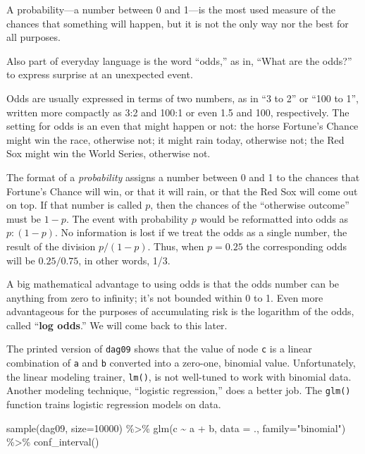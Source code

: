 \documentclass[
  letterpaper,
  DIV=11,
  numbers=noendperiod,
  oneside]{scrreprt}
\newenvironment{Shaded}{\begin{snugshade}}{\end{snugshade}}
\newcommand{\AttributeTok}[1]{\textcolor[rgb]{0.40,0.45,0.13}{#1}}
\newcommand{\DecValTok}[1]{\textcolor[rgb]{0.68,0.00,0.00}{#1}}
\newcommand{\FunctionTok}[1]{\textcolor[rgb]{0.28,0.35,0.67}{#1}}
\newcommand{\NormalTok}[1]{\textcolor[rgb]{0.00,0.23,0.31}{#1}}
\newcommand{\SpecialCharTok}[1]{\textcolor[rgb]{0.37,0.37,0.37}{#1}}
\newcommand{\StringTok}[1]{\textcolor[rgb]{0.13,0.47,0.30}{#1}}
\begin{document}
{\begin{footnotesize}
A probability---a number between 0 and 1---is the most used measure of
the chances that something will happen, but it is not the only way nor
the best for all purposes.

Also part of everyday language is the word ``odds,'' as in, ``What are
the odds?'' to express surprise at an unexpected event.

Odds are usually expressed in terms of two numbers, as in ``3 to 2'' or
``100 to 1'', written more compactly as 3:2 and 100:1 or even 1.5 and
100, respectively. The setting for odds is an even that might happen or
not: the horse Fortune's Chance might win the race, otherwise not; it
might rain today, otherwise not; the Red Sox might win the World Series,
otherwise not.

The format of a \emph{probability} assigns a number between 0 and 1 to
the chances that Fortune's Chance will win, or that it will rain, or
that the Red Sox will come out on top. If that number is called \(p\),
then the chances of the ``otherwise outcome'' must be \(1-p\). The event
with probability \(p\) would be reformatted into odds as \(p:(1-p)\). No
information is lost if we treat the odds as a single number, the result
of the division \(p/(1-p)\). Thus, when \(p=0.25\) the corresponding
odds will be \(0.25/0.75\), in other words, 1/3.

A big mathematical advantage to using odds is that the odds number can
be anything from zero to infinity; it's not bounded within 0 to 1. Even
more advantageous for the purposes of accumulating risk is the logarithm
of the odds, called ``\textbf{log odds}.'' We will come back to this
later.

The printed version of \texttt{dag09} shows that the value of node
\texttt{c} is a linear combination of \texttt{a} and \texttt{b}
converted into a zero-one, binomial value. Unfortunately, the linear
modeling trainer, \texttt{lm()}, is not well-tuned to work with binomial
data. Another modeling technique, ``logistic regression,'' does a better
job. The \texttt{glm()} function trains logistic regression models on
data.

\begin{Shaded}
\begin{Highlighting}[]
\FunctionTok{sample}\NormalTok{(dag09, }\AttributeTok{size=}\DecValTok{10000}\NormalTok{) }\SpecialCharTok{\%\textgreater{}\%} 
  \FunctionTok{glm}\NormalTok{(c }\SpecialCharTok{\textasciitilde{}}\NormalTok{ a }\SpecialCharTok{+}\NormalTok{ b, }\AttributeTok{data =}\NormalTok{ ., }\AttributeTok{family=}\StringTok{"binomial"}\NormalTok{) }\SpecialCharTok{\%\textgreater{}\%}
  \FunctionTok{conf\_interval}\NormalTok{()}
\end{Highlighting}
\end{Shaded}


\end{footnotesize}}
\end{document}
